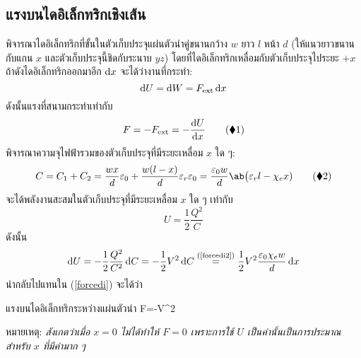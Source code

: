 \subsection{แรงบนไดอิเล็กทริกเชิงเส้น}
พิจารณาไดอิเล็กทริกที่ขั้นในตัวเก็บประจุแผ่นตัวนำคู่ขนานกว้าง $w$ ยาว $l$ หน้า $d$ (ให้แนวยาวขนานกับแกน $x$ และตัวเก็บประจุนี้ชิดกับระนาบ $yz$) โดยที่ไดอิเล็กทริกเหลื่อมกับตัวเก็บประจุไประยะ $+x$ ถ้าดังไดอิเล็กทริกออกมาอีก $\odif{x}$ จะได้ว่างานที่กระทำ:
\[
\odif{U}=\odif{W}=F_\txt{ext}\odif{x}
\]
ดังนั้นแรงที่สนามกระทำเท่ากับ
\begin{equation}
    F=-F_\txt{ext}=-\odv{U}{x}\tag{$\blacklozenge$1}\label{forcedi}
\end{equation}
พิจารณาความจุไฟฟ้ารวมของตัวเก็บประจุที่มีระยะเหลื่อม $x$ ใด ๆ:
\begin{equation}
C=C_1+C_2=\frac{wx}{d}\eps_0+\frac{w(l-x)}{d}\eps_r\eps_0=\frac{\eps_0w}{d}\ab\big(\eps_rl-\chi_ex)\tag{$\blacklozenge$2}\label{forcedi2}
\end{equation}
จะได้พลังงานสะสมในตัวเก็บประจุที่มีระยะเหลื่อม $x$ ใด ๆ เท่ากับ
\[
U=\frac{1}{2}\frac{Q^2}{C}
\]
ดังนั้น
\[
\odif{U}=-\frac{1}{2}\frac{Q^2}{C^2}\odif{C}=-\frac{1}{2}V^2\odif{C}\overset{\text{(\ref{forcedi2})}}{=}\frac{1}{2}V^2\frac{\eps_0\chi_ew}{d}\odif{x}
\]
นำกลับไปแทนใน (\ref{forcedi}) จะได้ว่า
\begin{eqbox}{แรงบนไดอิเล็กทริกระหว่างแผ่นตัวนำ}
    F=-V^2
\end{eqbox}
หมายเหตุ: \emph{สังเกตว่าเมื่อ $x=0$ ไม่ได้ทำให้ $F=0$ เพราะการใช้ $U$ เป็นค่านั้นเป็นการประมาณสำหรับ $x$ ที่มีค่ามาก ๆ}
